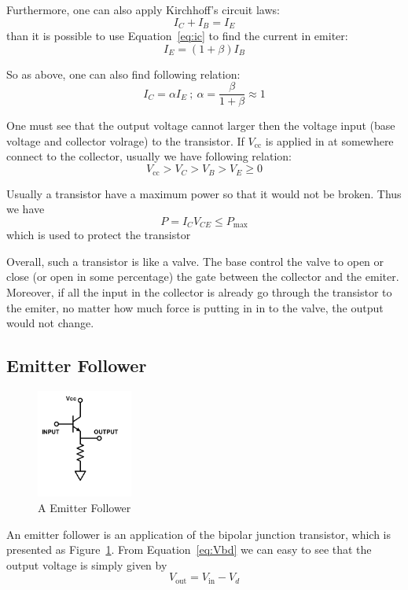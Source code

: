 \documentclass[aps,prl,reprint]{revtex4-1}
\newcommand{\vcc}{V_\text{cc}}
\begin{document}
Furthermore, one can also apply Kirchhoff's circuit laws:
\begin{equation}
    I_C + I_B = I_E \label{eq:kirchhoff}
\end{equation}
than it is possible to use Equation~\ref{eq:ic} to find the current in emiter:
\begin{equation}
    I_E = (1 + \beta)I_B \label{eq:ie}
\end{equation}

So as above, one can also find following relation:
\begin{equation*}
    I_C = \alpha I_E \ ; \  \alpha = \frac{\beta}{1 + \beta} \approx 1
\end{equation*}

One must see that the output voltage cannot larger then the voltage input (base voltage and collector volrage) to the transistor. If $\vcc$ is applied in at somewhere connect to the collector, usually we have following relation:
\begin{equation}
    \vcc > V_C > V_B > V_E \ge 0 \label{eq:vle}
\end{equation}

Usually a transistor have a maximum power so that it would not be broken. Thus we have
\begin{equation*}
    P = I_C V_{C\!E} \le P_\text{max}
\end{equation*}
which is used to protect the transistor

Overall, such a transistor is like a valve. The base control the valve to open or close (or open in some percentage) the gate between the collector and the emiter. Moreover, if all the input in the collector is already go through the transistor to the emiter, no matter how much force is putting in in to the valve, the output would not change.

\subsection{Emitter Follower}
\begin{figure}[h]
    \centering
    \includegraphics[height=1.4in]{image/Follower.pdf}
    \caption{A Emitter Follower}
    \label{fig:follower}
\end{figure}
An emitter follower is an application of the bipolar junction transistor, which is presented as Figure~\ref{fig:follower}. From Equation~\ref{eq:Vbd} we can easy to see that the output voltage is simply given by
\begin{equation}
    V_\text{out} = V_\text{in} - V_d \label{eq:follower}
\end{equation}
\end{document}
